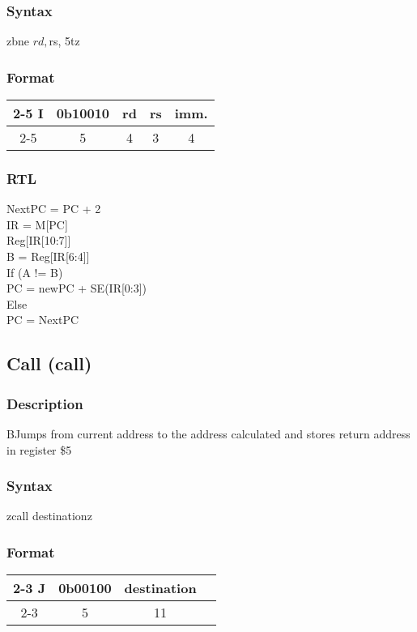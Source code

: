 \documentclass[12pt, a4paper]{report}
\begin{document}
	\subsubsection{Syntax}
	zbne    $rd, $rs, 5tz %
	\subsubsection{Format}
	\begin{center}
		{\renewcommand{\arraystretch}{1.5}
			\begin{tabular}[b]{c @{ } c | c | c | c|}
				\cline{2-5}
				I & \vline \hspace{1.5pt} 0b10010 & rd & rs & imm. \\
				\cline{2-5}
				\multicolumn{1}{}{} & \multicolumn{1}{c}{5} & \multicolumn{1}{c}{4}
				& \multicolumn{1}{c}{3} & \multicolumn{1}{c}{4}
			\end{tabular}}
	\end{center}
	\subsubsection{RTL}
	NextPC = PC + 2 \\
	IR = M[PC] \\
	Reg[IR[10:7]] \\
	B = Reg[IR[6:4]] \\
	If (A  !=  B) \\
	PC = newPC + SE(IR[0:3]) \\
	Else \\
	PC = NextPC \\
	
	\subsection{Call (call)}
	\subsubsection{Description}
	BJumps from current address to the address calculated and stores return address in register \$5
	\subsubsection{Syntax}
	zcall    destinationz %
	\subsubsection{Format}
	\begin{center}
		{\renewcommand{\arraystretch}{1.5}
			\begin{tabular}[b]{c @{ } c | c | c |}
				\cline{2-3}
				J & \vline \hspace{1.5pt} 0b00100 & destination \\
				\cline{2-3}
				\multicolumn{1}{}{} & \multicolumn{1}{c}{5} & \multicolumn{1}{c}{11}
			\end{tabular}}
	\end{center}
\end{document}
